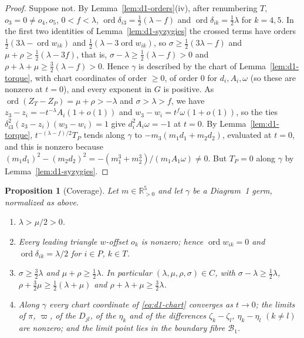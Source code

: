 \documentclass[11pt]{amsart}
\newenvironment{romanlist}{\begin{enumerate}\renewcommand{\labelenumi}{(\roman{enumi})}%
  \renewcommand{\theenumi}{\roman{enumi}}}{\end{enumerate}}
\newtheorem{proposition}[theorem]{Proposition}
\theoremstyle{definition}
\theoremstyle{remark}
\newcommand{\Rp}{\mathbb{R}_{>0}}
\newcommand{\ord}{\operatorname{ord}}
\begin{document}
\begin{proof}
Suppose not.  By Lemma~\ref{lem:d1-orders}(iv), after renumbering $T$, $o_3=0\ne o_4,o_5$,
$0<f<\lambda$, $\ord\delta_{i3}=\frac12(\lambda-f)$ and $\ord\delta_{ik}=\frac12\lambda$ for $k=4,5$.
In the first two identities of Lemma~\ref{lem:d1-syzygies} the crossed terms have orders
$\frac12(3\lambda-\ord w_{ik})$ and $\frac12(\lambda-3\ord w_{ik})$, so
$\sigma\ge\frac12(3\lambda-f)$ and $\mu+\rho\ge\frac12(\lambda-3f)$, that is,
$\sigma-\lambda\ge\frac12(\lambda-f)>0$ and $\rho+\lambda+\mu\ge\frac32(\lambda-f)>0$.
Hence $\gamma$ is described by the chart of Lemma~\ref{lem:d1-torque}, with chart coordinates of
order $\ge0$, of order $0$ for $d_i,A_i,\omega$ (so these are nonzero at $t=0$), and every
exponent in $G$ is positive.
As $\ord(Z_T-Z_P)=\mu+\rho>-\lambda$ and $\sigma>\lambda>f$, we have $z_3-z_i=-t^{-\lambda}A_i(1+o(1))$
and $w_3-w_i=t^f\omega(1+o(1))$, so the ties $\delta_{i3}^2(z_3-z_i)(w_3-w_i)=1$ give
$d_i^2A_i\omega=-1$ at $t=0$.
By Lemma~\ref{lem:d1-torque}, $t^{-(\lambda-f)/2}T_P$ tends along $\gamma$ to
$-m_3(m_1d_1+m_2d_2)$, evaluated at $t=0$, and this is nonzero because
$(m_1d_1)^2-(m_2d_2)^2=-(m_1^3+m_2^3)/(m_1A_1\omega)\ne0$.  But $T_P=0$ along $\gamma$ by
Lemma~\ref{lem:d1-syzygies}.
\end{proof}

\begin{proposition}[Coverage]\label{prop:d1-cover}
Let $m\in\Rp^5$ and let $\gamma$ be a Diagram~1 germ, normalized as above.
\begin{romanlist}
  \item $\lambda>\mu/2>0$.
  \item Every leading triangle $w$-offset $o_k$ is nonzero; hence $\ord w_{ik}=0$ and
  $\ord\delta_{ik}=\lambda/2$ for $i\in P$, $k\in T$.
  \item $\sigma\ge\frac32\lambda$ and $\mu+\rho\ge\frac12\lambda$.  In particular
  $(\lambda,\mu,\rho,\sigma)\in C$, with $\sigma-\lambda\ge\frac12\lambda$,
  $\rho+\frac32\mu\ge\frac12(\lambda+\mu)$ and $\rho+\lambda+\mu\ge\frac32\lambda$.
  \item Along $\gamma$ every chart coordinate of \eqref{eq:d1-chart} converges as $t\to0$; the
  limits of $\pi$, $\varpi$, of the $D_{jl}$, of the $\eta_k$ and of the differences
  $\zeta_k-\zeta_l$, $\eta_k-\eta_l$ $(k\ne l)$ are nonzero; and the limit point lies in the
  boundary fibre $\mathcal B_1$.
\end{romanlist}
\end{proposition}
\end{document}
